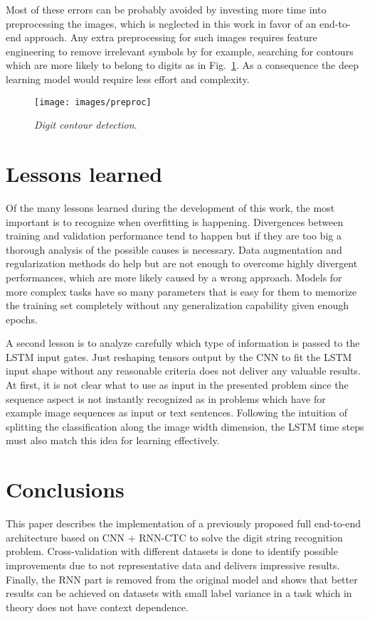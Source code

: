 Most of these errors can be probably avoided by investing more time into
preprocessing the images, which is neglected in this work in favor of an
end-to-end approach. Any extra preprocessing for such images requires feature
engineering to remove irrelevant symbols by for example, searching for contours
which are more likely to belong to digits as in Fig.~\ref{fig_preproc}. As a
consequence the deep learning model would require less effort and complexity.  

\begin{figure}[t]
\centerline{\texttt{[image: images/preproc]}}
\caption{{\it Digit contour detection}.}  
\label{fig_preproc}
\end{figure}

\section{Lessons learned} \label{sec:lessons}

Of the many lessons learned during the development of this work, the most
important is to recognize when overfitting is happening. Divergences between
training and validation performance tend to happen but if they are too big a
thorough analysis of the possible causes is necessary. Data augmentation and
regularization methods do help but are not enough to overcome highly divergent
performances, which are more likely caused by a wrong approach. Models for more
complex tasks have so many parameters that is easy for them to memorize the
training set completely without any generalization capability given enough
epochs. 

A second lesson is to analyze carefully which type of information is passed to
the LSTM input gates. Just reshaping tensors output by the CNN to fit the LSTM
input shape without any reasonable criteria does not deliver any valuable
results. At first, it is not clear what to use as input in the presented problem
since the sequence aspect is not instantly recognized as in problems which have
for example image sequences as input or text sentences. Following the intuition
of splitting the classification along the image width dimension, the LSTM time
steps must also match this idea for learning effectively.

\section{Conclusions}\label{sec:conclusion}

This paper describes the implementation of a previously proposed full end-to-end
architecture based on CNN + RNN-CTC to solve the digit string recognition
problem. Cross-validation with different datasets is done to identify possible
improvements due to not representative data and delivers impressive results.
Finally, the RNN part is removed from the original model and shows that better
results can be achieved on datasets with small label variance in a task which
in theory does not have context dependence. 
